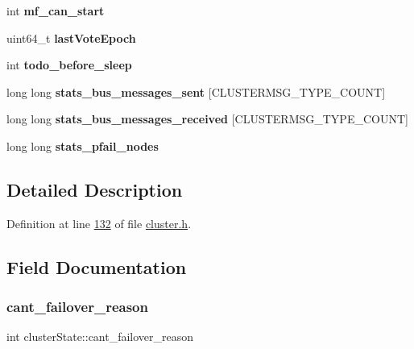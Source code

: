 \begin{DoxyCompactItemize}
\mbox{\label{structclusterState_a936611435312046bab0e1606ff815528}} 
int {\bfseries mf\+\_\+can\+\_\+start}
\item 
\mbox{\label{structclusterState_a94332a392b06214e98b82e5470fbff86}} 
uint64\+\_\+t {\bfseries last\+Vote\+Epoch}
\item 
\mbox{\label{structclusterState_ac9c16c374097b11583e5660659e2bc7a}} 
int {\bfseries todo\+\_\+before\+\_\+sleep}
\item 
\mbox{\label{structclusterState_a2e05a3efe6eef76b7db90b03f8a71a50}} 
long long {\bfseries stats\+\_\+bus\+\_\+messages\+\_\+sent} \mbox{[}C\+L\+U\+S\+T\+E\+R\+M\+S\+G\+\_\+\+T\+Y\+P\+E\+\_\+\+C\+O\+U\+NT\mbox{]}
\item 
\mbox{\label{structclusterState_ada00674128868894d7b81a5bcadf6994}} 
long long {\bfseries stats\+\_\+bus\+\_\+messages\+\_\+received} \mbox{[}C\+L\+U\+S\+T\+E\+R\+M\+S\+G\+\_\+\+T\+Y\+P\+E\+\_\+\+C\+O\+U\+NT\mbox{]}
\item 
\mbox{\label{structclusterState_ab6b2341a5c8bb775387a45c350c4a335}} 
long long {\bfseries stats\+\_\+pfail\+\_\+nodes}
\end{DoxyCompactItemize}


\subsection{Detailed Description}


Definition at line \hyperlink{cluster_8h_source_l00132}{132} of file \hyperlink{cluster_8h_source}{cluster.\+h}.



\subsection{Field Documentation}
\mbox{\label{structclusterState_a1a1d4314d9283a63d2c9167d6560f130}} 
\subsubsection{\texorpdfstring{cant\+\_\+failover\+\_\+reason}{cant\_failover\_reason}}
{\footnotesize\ttfamily int cluster\+State\+::cant\+\_\+failover\+\_\+reason}



